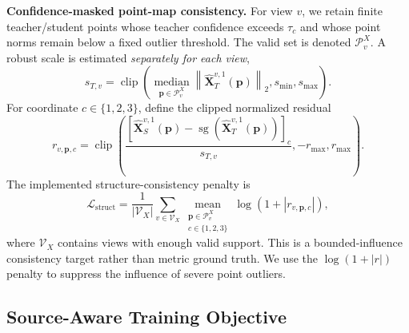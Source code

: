 \vspace{+5pt}
\noindent\textbf{Confidence-masked point-map consistency.}
For view $v$, we retain finite teacher/student points whose teacher confidence
exceeds $\tau_c$ and whose point norms remain below a fixed outlier threshold.
The valid set is denoted $\mathcal{P}^{X}_{v}$.  A robust scale is estimated
\emph{separately for each view},
\begin{equation}
s_{T,v}
=\operatorname{clip}\!\left(
\operatorname*{median}_{\mathbf{p}\in\mathcal{P}^{X}_{v}}
\left\|
\hat{\mathbf{X}}_{T}^{v,1}(\mathbf{p})
\right\|_2,
s_{\min},s_{\max}
\right).
\label{eq:teacher_geometry_scale}
\end{equation}
For coordinate $c\in\{1,2,3\}$, define the clipped normalized residual
\begin{equation}
r_{v,\mathbf{p},c}
=\operatorname{clip}\!\left(
\frac{
[\hat{\mathbf{X}}_{S}^{v,1}(\mathbf{p})
-\operatorname{sg}(\hat{\mathbf{X}}_{T}^{v,1}(\mathbf{p}))]_c
}{s_{T,v}},
-r_{\max},r_{\max}
\right).
\end{equation}
The implemented structure-consistency penalty is
\begin{equation}
\mathcal{L}_{\mathrm{struct}}
=\frac{1}{|\mathcal{V}_{X}|}
\sum_{v\in\mathcal{V}_{X}}
\underset{\substack{
\mathbf{p}\in\mathcal{P}^{X}_{v}\\c\in\{1,2,3\}
}}{\operatorname{mean}}
\log(1+|r_{v,\mathbf{p},c}|),
\label{eq:pointmap_consistency_loss}
\end{equation}
where $\mathcal{V}_{X}$ contains views with enough valid support.  This is a
bounded-influence consistency target rather than metric ground truth.  We use
the $\log(1+|r|)$ penalty to suppress the influence of severe point outliers.


\subsection{Source-Aware Training Objective}
\label{sec:method:training_obj}

